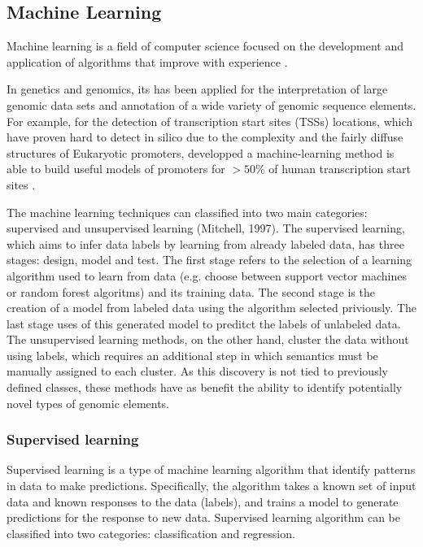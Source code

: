 \subsection{Machine Learning}

Machine learning is a field of computer science focused on the development and application of algorithms that improve with experience \cite{mitchell1997machine}.

In genetics and genomics, its  has been applied
 for the interpretation of large genomic data sets and annotation of a wide variety of genomic sequence elements.
For example, for the detection of  transcription start sites (TSSs) locations, which have proven hard to detect in silico due to the complexity and the fairly diffuse structures of Eukaryotic promoters,  developped a machine-learning method is able to build useful models of promoters for $>50\%$ of human transcription start sites \cite{down2002computational}.

The machine learning techniques can classified into two main categories: supervised and unsupervised learning (Mitchell, 1997). The supervised learning, which aims to infer data labels by learning from already labeled data, has three stages: design, model and test. The first stage refers to the selection of a learning algorithm used to learn from data (e.g. choose between support vector machines or random forest algoritms) and its training data. The second stage is the creation of a model from labeled data using the algorithm selected priviously.  The last stage uses of this generated model to  preditct the labels of unlabeled data.
The unsupervised learning methods, on the other hand,
cluster the data without using labels, which requires an additional step in which semantics must be manually assigned to each cluster. As this discovery is not tied to previously defined classes, these methods have as benefit the ability to identify potentially novel types of genomic elements.




\subsubsection{Supervised learning}

Supervised learning is a type of machine learning algorithm that identify patterns in data to make predictions.
Specifically, the algorithm takes a known set of input data and known responses to the data (labels), and trains a model to generate predictions for the response to new data.
Supervised learning algorithm can be classified into two  categories: classification and regression.


